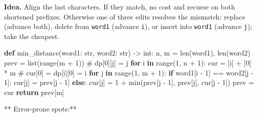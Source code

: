 \documentclass[11pt]{article}
\newenvironment{Shaded}{\begin{snugshade}}{\end{snugshade}}
\newcommand{\BuiltInTok}[1]{\textcolor[rgb]{0.50,0.55,0.55}{#1}}
\newcommand{\CommentTok}[1]{\textcolor[rgb]{0.48,0.49,0.49}{#1}}
\newcommand{\ControlFlowTok}[1]{\textcolor[rgb]{0.99,0.74,0.29}{\textbf{#1}}}
\newcommand{\DecValTok}[1]{\textcolor[rgb]{0.96,0.45,0.00}{#1}}
\newcommand{\KeywordTok}[1]{\textcolor[rgb]{0.81,0.81,0.76}{\textbf{#1}}}
\newcommand{\NormalTok}[1]{\textcolor[rgb]{0.81,0.81,0.76}{#1}}
\newcommand{\OperatorTok}[1]{\textcolor[rgb]{0.81,0.81,0.76}{#1}}
\begin{document}
\textbf{Idea.} Align the last characters. If they match, no cost and recurse on both shortened prefixes. Otherwise one of three edits resolves the mismatch: replace (advance both), delete from \texttt{word1} (advance \texttt{i}), or insert into \texttt{word1} (advance \texttt{j}); take the cheapest.


\begin{Shaded}
\begin{Highlighting}[]
\KeywordTok{def}\NormalTok{ min\_distance(word1: }\BuiltInTok{str}\NormalTok{, word2: }\BuiltInTok{str}\NormalTok{) }\OperatorTok{{-}\textgreater{}} \BuiltInTok{int}\NormalTok{:}
\NormalTok{    n, m }\OperatorTok{=} \BuiltInTok{len}\NormalTok{(word1), }\BuiltInTok{len}\NormalTok{(word2)}
\NormalTok{    prev }\OperatorTok{=} \BuiltInTok{list}\NormalTok{(}\BuiltInTok{range}\NormalTok{(m }\OperatorTok{+} \DecValTok{1}\NormalTok{))          }\CommentTok{\# dp[0][j] = j}
    \ControlFlowTok{for}\NormalTok{ i }\KeywordTok{in} \BuiltInTok{range}\NormalTok{(}\DecValTok{1}\NormalTok{, n }\OperatorTok{+} \DecValTok{1}\NormalTok{):}
\NormalTok{        cur }\OperatorTok{=}\NormalTok{ [i] }\OperatorTok{+}\NormalTok{ [}\DecValTok{0}\NormalTok{] }\OperatorTok{*}\NormalTok{ m            }\CommentTok{\# cur[0] = dp[i][0] = i}
        \ControlFlowTok{for}\NormalTok{ j }\KeywordTok{in} \BuiltInTok{range}\NormalTok{(}\DecValTok{1}\NormalTok{, m }\OperatorTok{+} \DecValTok{1}\NormalTok{):}
            \ControlFlowTok{if}\NormalTok{ word1[i }\OperatorTok{{-}} \DecValTok{1}\NormalTok{] }\OperatorTok{==}\NormalTok{ word2[j }\OperatorTok{{-}} \DecValTok{1}\NormalTok{]:}
\NormalTok{                cur[j] }\OperatorTok{=}\NormalTok{ prev[j }\OperatorTok{{-}} \DecValTok{1}\NormalTok{]}
            \ControlFlowTok{else}\NormalTok{:}
\NormalTok{                cur[j] }\OperatorTok{=} \DecValTok{1} \OperatorTok{+} \BuiltInTok{min}\NormalTok{(prev[j }\OperatorTok{{-}} \DecValTok{1}\NormalTok{], prev[j], cur[j }\OperatorTok{{-}} \DecValTok{1}\NormalTok{])}
\NormalTok{        prev }\OperatorTok{=}\NormalTok{ cur}
    \ControlFlowTok{return}\NormalTok{ prev[m]}
\end{Highlighting}
\end{Shaded}

** Error-prone spots:**
\end{document}
